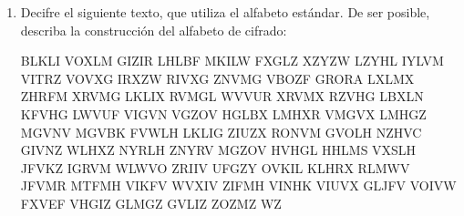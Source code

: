 \documentclass[12pt]{article}
\begin{document}
\begin{enumerate}

\item Decifre el siguiente texto, que utiliza el alfabeto estándar. De ser posible, describa la construcción del alfabeto de cifrado: 

\begin{addmargin}[1em]{2em} %
BLKLI VOXLM GIZIR LHLBF MKILW FXGLZ XZYZW LZYHL IYLVM
VITRZ VOVXG IRXZW RIVXG ZNVMG VBOZF GRORA LXLMX ZHRFM
XRVMG LKLIX RVMGL WVVUR XRVMX RZVHG LBXLN KFVHG LWVUF
VIGVN VGZOV HGLBX LMHXR VMGVX LMHGZ MGVNV MGVBK FVWLH
LKLIG ZIUZX RONVM GVOLH NZHVC GIVNZ WLHXZ NYRLH ZNYRV
MGZOV HVHGL HHLMS VXSLH JFVKZ IGRVM WLWVO ZRIIV UFGZY
OVKIL KLHRX RLMWV JFVMR MTFMH VIKFV WVXIV ZIFMH VINHK
VIUVX GLJFV VOIVW FXVEF VHGIZ GLMGZ GVLIZ ZOZMZ WZ\hspace*{21pt}
\end{addmargin}


\end{enumerate}
\end{document}
